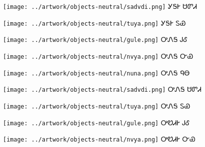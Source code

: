 \documentclass[avery5371]{flashcards}%
\begin{document}
\begin{flashcard}{
\texttt{[image: ../artwork/objects-neutral/sadvdi.png]}
}\Huge ᎩᎦᎨ ᏌᏛᏗ
\end{flashcard}

\begin{flashcard}{
\texttt{[image: ../artwork/objects-neutral/tuya.png]}
}\Huge ᎩᎦᎨ ᏚᏯ
\end{flashcard}

\begin{flashcard}{
\texttt{[image: ../artwork/objects-neutral/gule.png]}
}\Huge ᎤᏁᎦ ᎫᎴ
\end{flashcard}

\begin{flashcard}{
\texttt{[image: ../artwork/objects-neutral/nvya.png]}
}\Huge ᎤᏁᎦ ᏅᏯ
\end{flashcard}

\begin{flashcard}{
\texttt{[image: ../artwork/objects-neutral/nuna.png]}
}\Huge ᎤᏁᎦ ᏄᎾ
\end{flashcard}

\begin{flashcard}{
\texttt{[image: ../artwork/objects-neutral/sadvdi.png]}
}\Huge ᎤᏁᎦ ᏌᏛᏗ
\end{flashcard}

\begin{flashcard}{
\texttt{[image: ../artwork/objects-neutral/tuya.png]}
}\Huge ᎤᏁᎦ ᏚᏯ
\end{flashcard}

\begin{flashcard}{
\texttt{[image: ../artwork/objects-neutral/gule.png]}
}\Huge ᎤᏬᏗᎨ ᎫᎴ
\end{flashcard}

\begin{flashcard}{
\texttt{[image: ../artwork/objects-neutral/nvya.png]}
}\Huge ᎤᏬᏗᎨ ᏅᏯ
\end{flashcard}
\end{document}

